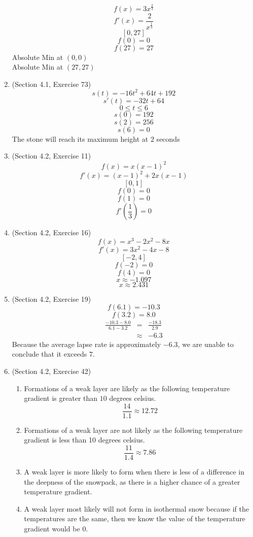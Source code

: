 \documentclass{article}
\begin{document}
\begin{enumerate}
        $$f(x) = 3x^{\frac{2}{3}}$$
        $$f'(x) = \frac{2}{x^{\frac{1}{3}}}$$
        $$[0, 27]$$
        $$f(0) = 0$$
        $$f(27) = 27$$
        Absolute Min at $(0, 0)$ \\
        Absolute Min at $(27, 27)$
    \item (Section 4.1, Exercise 73)
        $$s(t) = -16t^2 + 64t + 192$$
        $$s'(t) = -32t + 64$$
        $$0 \leq t \leq 6$$
        $$s(0) = 192$$
        $$s(2) = 256$$
        $$s(6) = 0$$
        The stone will reach its maximum height at $2$ seconds
    \item (Section 4.2, Exercise 11)
        $$f(x) = x\left(x - 1\right)^2$$
        $$f'(x) = \left(x - 1\right)^2 + 2x\left(x - 1\right)$$
        $$[0, 1]$$
        $$f(0) = 0$$
        $$f(1) = 0$$
        $$f'\left(\frac{1}{3}\right) = 0$$
    \item (Section 4.2, Exercise 16)
        $$f(x) = x^3 - 2x^2 - 8x$$
        $$f'(x) = 3x^2 - 4x - 8$$
        $$[-2, 4]$$
        $$f(-2) = 0$$
        $$f(4) = 0$$
        $$x \approx -1.097$$
        $$x \approx 2.431$$
    \item (Section 4.2, Exercise 19)
        $$f(6.1) = -10.3$$
        $$f(3.2) = 8.0$$
        \begin{eqnarray}
            \frac{-10.3 - 8.0}{6.1 - 3.2} &=& \frac{-18.3}{2.9} \\
                                          &\approx& -6.3
        \end{eqnarray}
        Because the average lapse rate is approximately $-6.3$, we are unable to conclude that it exceeds $7$.
    \item (Section 4.2, Exercise 42)
        \begin{enumerate}
            \item Formations of a weak layer are likely as the following temperature gradient is greater than $10$ degrees celsius.
                $$\frac{14}{1.1} \approx 12.72$$
            \item Formations of a weak layer are not likely as the following temperature gradient is less than 10 degrees celsius.
                $$\frac{11}{1.4} \approx 7.86$$
            \item A weak layer is more likely to form when there is less of a difference in the deepness of the snowpack, as there is a higher chance of a greater temperature gradient.
            \item A weak layer most likely will not form in isothermal snow because if the temperatures are the same, then we know the value of the temperature gradient would be $0$.

\end{enumerate}
\end{enumerate}
\end{document}
